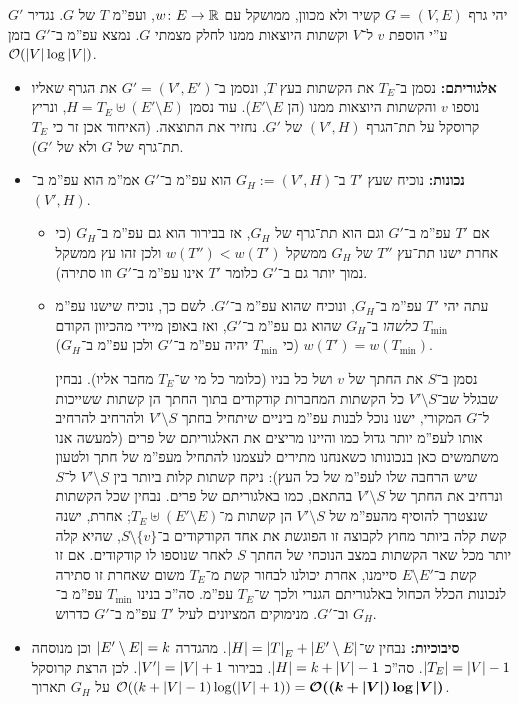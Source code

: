 \documentclass[]{../../../../tex/classes/homework}
\begin{document}
	יהי גרף $G = (V, E)$ קשיר ולא מכוון, ממושקל עם $w \colon E \to \mathbb{R}$, ועפ''מ $T$ של $G$. נגדיר $G'$ ע''י הוספת $v$ ל־$V$ וקשתות היוצאות ממנו לחלק מצמתי $G$. נמצא עפ''מ ב־$G'$ בזמן $\mathcal{O}(\left \lvert V \right \rvert \log \left \lvert V \right \rvert)$. 
	\begin{itemize}
		\item \textbf{אלגוריתם: }נסמן ב־$T_E$ את הקשתות בעץ $T$, ונסמן ב־$G' = (V', E')$ את הגרף שאליו נוספו $v$ והקשתות היוצאות ממנו (הן $E' \setminus E$). עוד נסמן $H = T_E \uplus (E' \setminus E)$, ונריץ קרוסקל על תת־הגרף $(V', H)$ של $G'$. נחזיר את התוצאה. (האיחוד אכן זר כי $T_E$ תת־גרף של $G$ ולא של $G'$). 
		\item \textbf{נכונות: }נוכיח שעץ $T'$ ב־$G_H := (V', H)$ הוא עפ''מ ב־$G'$ אמ''מ הוא עפ''מ ב־$(V', H)$. 
		\begin{itemize}
			\item אם $T'$ עפ''מ ב־$G'$ וגם הוא תת־גרף של $G_H$, אז בבירור הוא גם עפ''מ ב־$G_H$ (כי אחרת ישנו תת־עץ $T''$ של $G_H$ ממשקל $w(T'') < w(T')$ ולכן זהו עץ ממשקל נמוך יותר גם ב־$G'$ כלומר $T'$ אינו עפ''מ ב־$G'$ וזו סתירה). 
			\item עתה יהי $T'$ עפ''מ ב־$G_H$, ונוכיח שהוא עפ''מ ב־$G'$. לשם כך, נוכיח שישנו עפ''מ $T_{\min}$ \textit{כלשהו} ב־$G_H$ שהוא גם עפ''מ ב־$G'$, ואז באופן מיידי מהכיוון הקודם $w(T') = w(T_{\min})$ (כי $T_{\min}$ יהיה עפ''מ ב־$G'$ ולכן עפ''מ ב־$G_H$). 
			
			נסמן ב־$S$ את החתך של $v$ ושל כל בניו (כלומר כל מי ש־$T_E$ מחבר אליו). נבחין שבגלל שב־$V' \setminus S$ כל הקשתות המחברות קודקודים בתוך החתך הן קשתות ששייכות ל־$G$ המקורי, ישנו נוכל לבנות עפ''מ ביניים שיתחיל בחתך $V' \setminus S$ ולהרחיב להרחיב אותו לעפ''מ יותר גדול כמו והיינו מריצים את האלגוריתם של פרים (למעשה אנו משתמשים כאן בנכונותו כשאנחנו מתירים לעצמנו להתחיל מעפ''מ של חתך ולטעון שיש הרחבה שלו לעפ''מ של כל העץ): ניקח קשתות קלות ביותר בין $V' \setminus S$ ל־$S$ ונרחיב את החתך של $V' \setminus S$ בהתאם, כמו באלגוריתם של פרים. נבחין שכל הקשתות שנצטרך להוסיף מהעפ''מ של $V' \setminus S$ הן קשתות מ־$T_E \uplus (E' \setminus E)$; אחרת, ישנה קשת קלה ביותר מחוץ לקבוצה זו הפוגשת את אחד הקודקודים ב־$S \setminus \{v\}$, שהיא קלה יותר מכל שאר הקשתות במצב הנוכחי של החתך $S$ לאחר שנוספו לו קודקודים. אם זו קשת ב־$E \setminus E'$ סיימנו, אחרת יכולנו לבחור קשת מ־$T_E$ משום שאחרת זו סתירה לנכונות הכלל הכחול באלגוריתם הגנרי ולכך ש־$T_E$ עפ''מ. סה''כ בנינו $T_{\min}$ עפ''מ ב־$G_H$ וב־$G'$. מנימוקים המציונים לעיל $T'$ עפ''מ ב־$G'$ כדרוש. 
		\end{itemize}
		
		\item \textbf{סיבוכיות: }נבחין ש־$\left \lvert H \right \rvert = \left \lvert T \right \rvert_E + \left \lvert E' \setminus E \right \rvert$. מהגדרה $\left \lvert E' \setminus E \right \rvert = k$ וכן מנוסחה $\left \lvert T_E \right \rvert = \left \lvert V \right \rvert - 1$. סה''כ $\left \lvert H \right \rvert = k + \left \lvert V \right \rvert - 1$. בבירור $\left \lvert V' \right \rvert = \left \lvert V \right \rvert + 1$. לכן הרצת קרוסקל על $G_H$ תארוך $\mathcal{O}((k + \left \lvert V \right \rvert  - 1)\log(\left \lvert V \right \rvert + 1)) = \bm{\mathcal{O}((k + \left \lvert V \right \rvert)\log \left \lvert V \right \rvert)}$. 
	\end{itemize}
	
\end{document}
